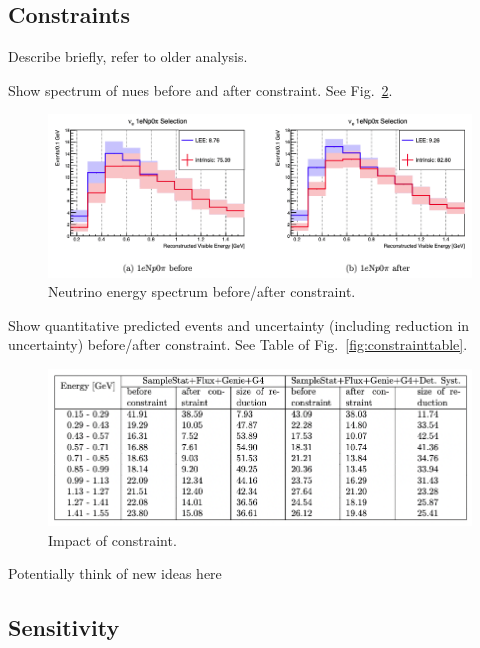 \newpage
\subsection{Constraints}
Describe briefly, refer to older analysis.

Show spectrum of nues before and after constraint. See Fig.~\ref{fig:constraint}.

\begin{center}
\begin{figure}[h]
    \includegraphics[width=1.00\textwidth]{technote/SystematicsSensitivity/Figures/constraint.png}
    \caption{Neutrino energy spectrum before/after constraint.}
    \label{fig:constraint}
\end{figure}
\end{center}

Show quantitative predicted events and uncertainty (including reduction in uncertainty) before/after constraint. See Table of Fig.~\ref{fig:constrainttable}.

\begin{center}
\begin{figure}
    \includegraphics[width=1.00\textwidth]{technote/SystematicsSensitivity/Figures/constrainttable.png}
    \caption{Impact of constraint.}
    \label{fig:constraint} 
\end{figure}
\end{center}

Potentially think of new ideas here

\newpage
\subsection{Sensitivity}
\label{sec:sensitivity}

